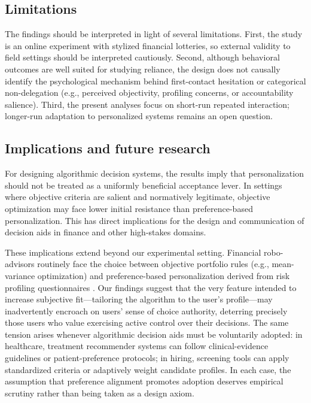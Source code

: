 \documentclass[a4paper, 12pt, fleqn]{article}
\theoremstyle{definition}
\begin{document}
\subsection{Limitations}
The findings should be interpreted in light of several limitations. First, the study is an online experiment with stylized financial lotteries, so external validity to field settings should be interpreted cautiously. Second, although behavioral outcomes are well suited for studying reliance, the design does not causally identify the psychological mechanism behind first-contact hesitation or categorical non-delegation (e.g., perceived objectivity, profiling concerns, or accountability salience). Third, the present analyses focus on short-run repeated interaction; longer-run adaptation to personalized systems remains an open question.

\subsection{Implications and future research}
For designing algorithmic decision systems, the results imply that personalization should not be treated as a uniformly beneficial acceptance lever. In settings where objective criteria are salient and normatively legitimate, objective optimization may face lower initial resistance than preference-based personalization. This has direct implications for the design and communication of decision aids in finance and other high-stakes domains.

These implications extend beyond our experimental setting. Financial robo-advisors routinely face the choice between objective portfolio rules (e.g., mean-variance optimization) and preference-based personalization derived from risk profiling questionnaires \citep{Capponi2022,Ruehr2020}. Our findings suggest that the very feature intended to increase subjective fit---tailoring the algorithm to the user's profile---may inadvertently encroach on users' sense of choice authority, deterring precisely those users who value exercising active control over their decisions. The same tension arises whenever algorithmic decision aids must be voluntarily adopted: in healthcare, treatment recommender systems can follow clinical-evidence guidelines or patient-preference protocols; in hiring, screening tools can apply standardized criteria or adaptively weight candidate profiles. In each case, the assumption that preference alignment promotes adoption deserves empirical scrutiny rather than being taken as a design axiom.
\end{document}
